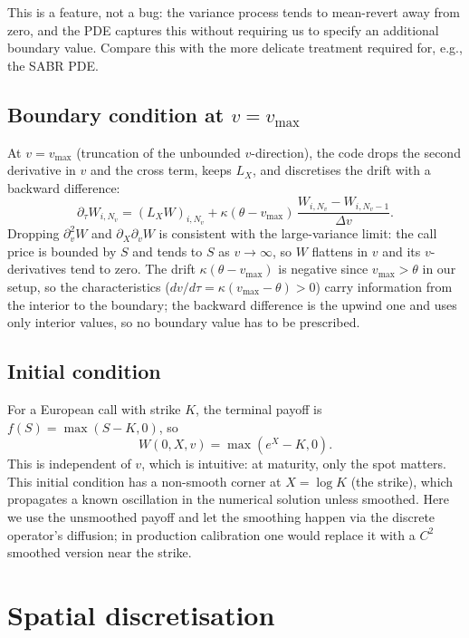 \documentclass[11pt]{article}
\theoremstyle{plain}
\theoremstyle{definition}
\theoremstyle{remark}
\begin{document}
This is a feature, not a bug: the variance process tends to mean-revert away from zero, and the PDE captures this without requiring us to specify an additional boundary value. Compare this with the more delicate treatment required for, e.g., the SABR PDE.

\subsection{Boundary condition at $v = v_{\max}$}

At $v = v_{\max}$ (truncation of the unbounded $v$-direction), the code drops the second derivative in $v$ and the cross term, keeps $L_X$, and discretises the drift with a backward difference:
\[
    \partial_\tau W_{i, N_v} = (L_X W)_{i, N_v} + \kappa(\theta - v_{\max})\, \frac{W_{i, N_v} - W_{i, N_v - 1}}{\Delta v}.
\]
Dropping $\partial^2_v W$ and $\partial_X \partial_v W$ is consistent with the large-variance limit: the call price is bounded by $S$ and tends to $S$ as $v \to \infty$, so $W$ flattens in $v$ and its $v$-derivatives tend to zero. The drift $\kappa(\theta - v_{\max})$ is negative since $v_{\max} > \theta$ in our setup, so the characteristics ($dv/d\tau = \kappa(v_{\max} - \theta) > 0$) carry information from the interior to the boundary; the backward difference is the upwind one and uses only interior values, so no boundary value has to be prescribed.

\subsection{Initial condition}

For a European call with strike $K$, the terminal payoff is $f(S) = \max(S - K, 0)$, so
\[
    W(0, X, v) = \max(e^X - K, 0).
\]
This is independent of $v$, which is intuitive: at maturity, only the spot matters. This initial condition has a non-smooth corner at $X = \log K$ (the strike), which propagates a known oscillation in the numerical solution unless smoothed. Here we use the unsmoothed payoff and let the smoothing happen via the discrete operator's diffusion; in production calibration one would replace it with a $C^2$ smoothed version near the strike.

\section{Spatial discretisation}
\end{document}
